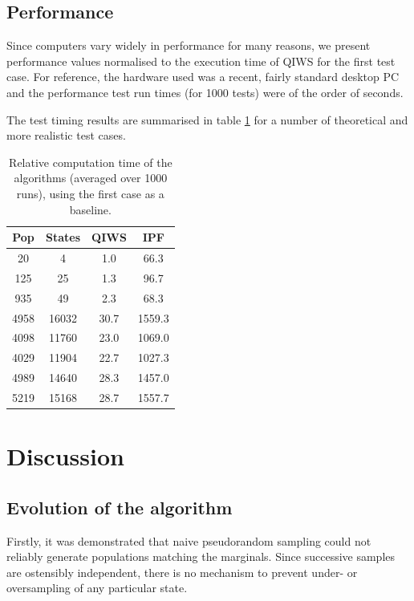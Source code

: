 \documentclass{JASSS}
\begin{document}
\subsection{Performance}\label{performance}

Since computers vary widely in performance for many reasons, we present
performance values normalised to the execution time of QIWS for the first test case. For reference, the hardware used was a recent, fairly standard desktop PC and the performance test run times (for 1000 tests) were of the order of seconds.

The test timing results are summarised in table \ref{tab:perf} for a number of theoretical and more realistic test cases.

\begin{table}[!t]
	\centering
	\begin{tabular}{|c|c|c|c|}\hline
	  Pop & States & QIWS & IPF\\\hline
	  20 & 4 & 1.0 & 66.3 \\
	  125 & 25 & 1.3 & 96.7\\
	  935 & 49 & 2.3 & 68.3\\
	  4958 & 16032 & 30.7 & 1559.3\\
	  4098 & 11760 & 23.0 & 1069.0\\
	  4029 & 11904 & 22.7 & 1027.3\\
	  4989 & 14640 & 28.3 & 1457.0\\
	  5219 & 15168 & 28.7 & 1557.7\\\hline		
	\end{tabular}
	\caption{Relative computation time of the algorithms (averaged over 1000 runs), using the first case as a baseline.}
	\label{tab:perf}	
\end{table}

\section{Discussion}\label{discussion}

\subsection{Evolution of the algorithm}\label{evolution-of-the-algorithm}

Firstly, it was demonstrated that naive pseudorandom sampling could not
reliably generate populations matching the marginals. Since successive
samples are ostensibly independent, there is no mechanism to prevent
under- or oversampling of any particular state.
\end{document}
